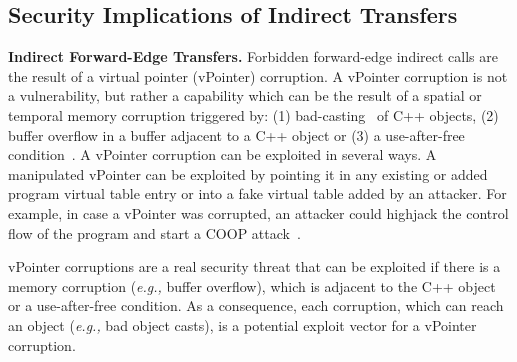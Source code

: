 \subsection{Security Implications of Indirect Transfers}
\label{Security Implications of Forbidden Forward Indirect Calls}
\textbf{Indirect Forward-Edge Transfers.} 
Forbidden forward-edge indirect calls are the result of a virtual pointer (vPointer) corruption. A vPointer corruption is not a vulnerability, but rather a capability which
can be the result of a spatial or temporal memory corruption triggered by: 
(1) bad-casting~\cite{byoungyoung:typecasting} of C++ objects, 
(2) buffer overflow in a buffer adjacent to a C++ object or 
(3) a use-after-free condition~\cite{schuster:coop}.
A vPointer corruption can be exploited in several ways. A manipulated vPointer can be exploited by pointing it in any existing or added program virtual 
table entry or into a fake virtual table added by an attacker. For example, in case a vPointer
was corrupted, an attacker could highjack the control flow of the program and start a COOP attack~\cite{schuster:coop}.

vPointer corruptions are a real security threat that can be exploited if there is a memory corruption (\textit{e.g.,} buffer overflow), which is adjacent 
to the C++ object or a use-after-free condition. As a consequence, each corruption, which can reach an object (\textit{e.g.,} bad object casts), is a potential
exploit vector for a vPointer corruption. 


